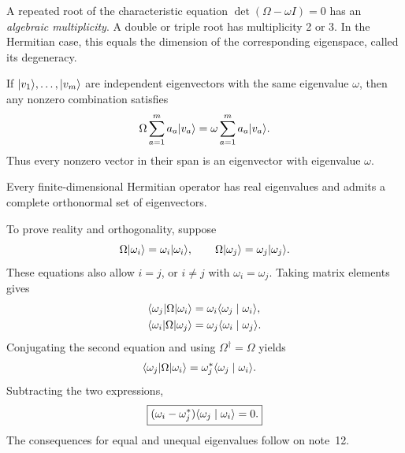 A repeated root of the characteristic equation
$\det(\Omega-\omega I)=0$ has an \emph{algebraic multiplicity}.
A double or triple root has multiplicity 2 or 3. In the Hermitian case,
this equals the dimension of the corresponding eigenspace, called
its degeneracy.

If $\lvert v_1\rangle,\ldots,\lvert v_m\rangle$ are independent eigenvectors with the
same eigenvalue $\omega$, then any nonzero combination satisfies
\[
 \Omega\sum_{a=1}^{m}a_a\lvert v_a\rangle
 =\omega\sum_{a=1}^{m}a_a\lvert v_a\rangle.
\]
Thus every nonzero vector in their span is an eigenvector with
eigenvalue $\omega$.

Every finite-dimensional Hermitian operator has real eigenvalues and
admits a complete orthonormal set of eigenvectors.

To prove reality and orthogonality, suppose
\[
 \Omega\lvert \omega_i\rangle=\omega_i\lvert \omega_i\rangle,\qquad
 \Omega\lvert \omega_j\rangle=\omega_j\lvert \omega_j\rangle.
\]
These equations also allow $i=j$, or $i\ne j$ with
$\omega_i=\omega_j$. Taking matrix elements gives
\begin{align*}
 \langle \omega_j\rvert \Omega\lvert \omega_i\rangle
 &=\omega_i\langle \omega_j\mid \omega_i\rangle,\\
 \langle \omega_i\rvert \Omega\lvert \omega_j\rangle
 &=\omega_j\langle \omega_i\mid \omega_j\rangle.
\end{align*}
Conjugating the second equation and using
$\Omega^\dagger=\Omega$ yields
\begin{align*}
 \langle \omega_j\rvert \Omega\lvert \omega_i\rangle
 &=\omega_j^*\langle \omega_j\mid \omega_i\rangle.
\end{align*}
Subtracting the two expressions,
\[
 \boxed{(\omega_i-\omega_j^*)\langle \omega_j\mid \omega_i\rangle=0.}
\]
The consequences for equal and unequal eigenvalues follow on note~12.
